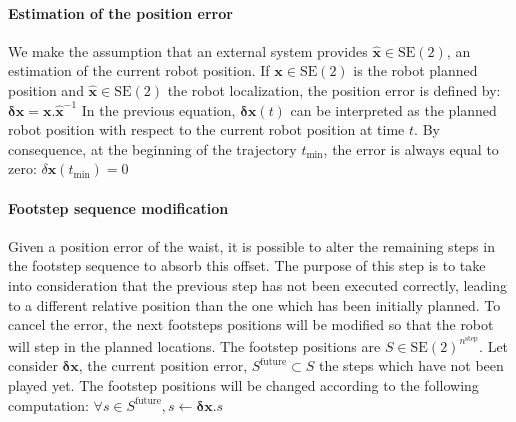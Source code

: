 \paragraph{Estimation of the position error}
%
We make the assumption that an external system provides
\mbox{$\hat{\mathbf{x}} \in \text{SE}(2)$}, an estimation of the
current robot position.
%
If $\mathbf{x} \in \text{SE}(2)$ is the robot planned position and
$\hat{\mathbf{x}} \in \text{SE}(2)$ the robot localization, the
position error is defined by: $\mathbf{\delta x} = \mathbf{x} . \hat{\mathbf{x}}^{-1}$\label{eq:errorpos}
%
%
In the previous equation, $\mathbf{\delta x}(t)$ can be
interpreted as the planned robot position with respect to the current
robot position at time $t$. By consequence, at the beginning of the
trajectory $t_{\text{min}}$, the error is always equal to zero: $\delta \mathbf{x}(t_{\text{min}}) = 0$ \label{eq:errorpos_prop}
%
%
\paragraph{Footstep sequence modification}
%
%
Given a position error of the waist, it is possible to alter the
remaining steps in the footstep sequence to absorb this offset.
%
The purpose of this step is to take into consideration that the
previous step has not been executed correctly, leading to a different
relative position than the one which has been initially planned. To
cancel the error, the next footsteps positions will be modified
so that the robot will step in the planned locations.
%
%
The footstep positions are \mbox{$S \in
  \text{SE}(2)^{n^\text{step}}$}. Let consider $\mathbf{\delta {x}}$,
the current position error, \mbox{$S^{\text{future}} \subset S$} the
steps which have not been played yet. The footstep positions will be
changed according to the following computation: $\forall s \in S^{\text{future}}, s \gets \mathbf{\delta {x}} . s$ \label{eq:footstepmodif}
%
%
%

